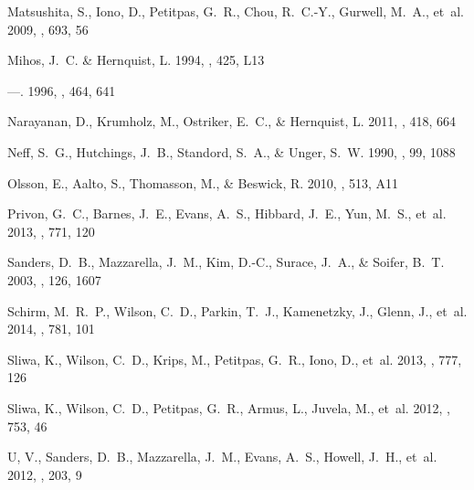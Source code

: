 \documentclass[preprint, 11pt]{aastex}
\begin{document}
\begin{thebibliography}{28}
{Matsushita}, S., {Iono}, D., {Petitpas}, G.~R., {Chou}, R.~C.-Y., {Gurwell},
  M.~A., {et~al.} 2009, \apj, 693, 56

{Mihos}, J.~C. \& {Hernquist}, L. 1994, \apjl, 425, L13

---. 1996, \apj, 464, 641

{Narayanan}, D., {Krumholz}, M., {Ostriker}, E.~C., \& {Hernquist}, L. 2011,
  \mnras, 418, 664

{Neff}, S.~G., {Hutchings}, J.~B., {Standord}, S.~A., \& {Unger}, S.~W. 1990,
  \aj, 99, 1088

{Olsson}, E., {Aalto}, S., {Thomasson}, M., \& {Beswick}, R. 2010, \aap, 513,
  A11

{Privon}, G.~C., {Barnes}, J.~E., {Evans}, A.~S., {Hibbard}, J.~E., {Yun},
  M.~S., {et~al.} 2013, \apj, 771, 120

{Sanders}, D.~B., {Mazzarella}, J.~M., {Kim}, D.-C., {Surace}, J.~A., \&
  {Soifer}, B.~T. 2003, \aj, 126, 1607

{Schirm}, M.~R.~P., {Wilson}, C.~D., {Parkin}, T.~J., {Kamenetzky}, J.,
  {Glenn}, J., {et~al.} 2014, \apj, 781, 101

{Sliwa}, K., {Wilson}, C.~D., {Krips}, M., {Petitpas}, G.~R., {Iono}, D.,
  {et~al.} 2013, \apj, 777, 126

{Sliwa}, K., {Wilson}, C.~D., {Petitpas}, G.~R., {Armus}, L., {Juvela}, M.,
  {et~al.} 2012, \apj, 753, 46

{U}, V., {Sanders}, D.~B., {Mazzarella}, J.~M., {Evans}, A.~S., {Howell},
  J.~H., {et~al.} 2012, \apjs, 203, 9


\end{thebibliography}
\end{document}
